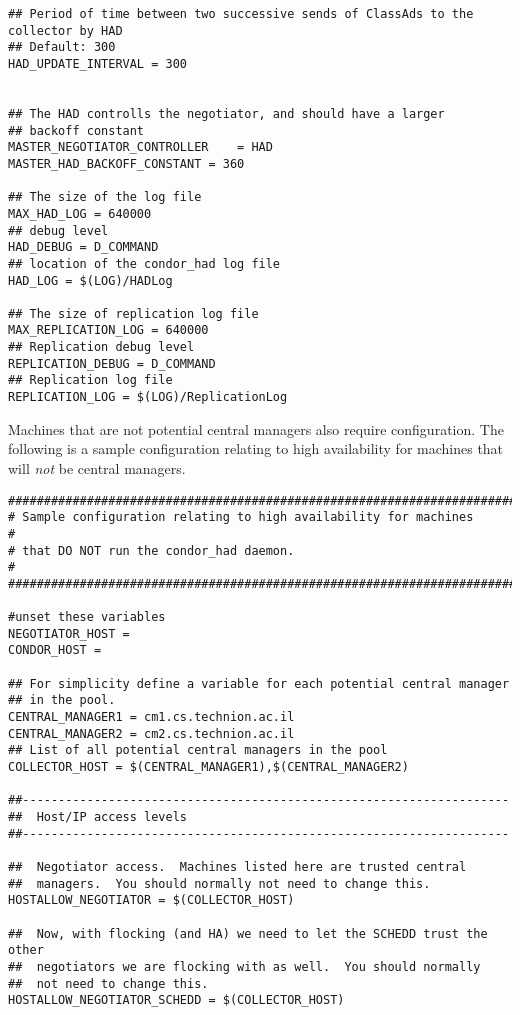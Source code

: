 \begin{verbatim}
## Period of time between two successive sends of ClassAds to the collector by HAD
## Default: 300
HAD_UPDATE_INTERVAL = 300


## The HAD controlls the negotiator, and should have a larger
## backoff constant
MASTER_NEGOTIATOR_CONTROLLER	= HAD
MASTER_HAD_BACKOFF_CONSTANT	= 360

## The size of the log file
MAX_HAD_LOG = 640000
## debug level 
HAD_DEBUG = D_COMMAND
## location of the condor_had log file
HAD_LOG = $(LOG)/HADLog

## The size of replication log file
MAX_REPLICATION_LOG = 640000
## Replication debug level 
REPLICATION_DEBUG = D_COMMAND
## Replication log file
REPLICATION_LOG = $(LOG)/ReplicationLog

\end{verbatim}
\normalsize

Machines that are not potential central managers also 
require configuration.
The following is a sample configuration relating to
high availability for machines that will \emph{not} be central managers.

\footnotesize
\begin{verbatim}
##########################################################################
# Sample configuration relating to high availability for machines        # 
# that DO NOT run the condor_had daemon.                                 #
##########################################################################

#unset these variables 
NEGOTIATOR_HOST =
CONDOR_HOST =

## For simplicity define a variable for each potential central manager
## in the pool. 
CENTRAL_MANAGER1 = cm1.cs.technion.ac.il
CENTRAL_MANAGER2 = cm2.cs.technion.ac.il
## List of all potential central managers in the pool
COLLECTOR_HOST = $(CENTRAL_MANAGER1),$(CENTRAL_MANAGER2)

##--------------------------------------------------------------------
##  Host/IP access levels
##--------------------------------------------------------------------

##  Negotiator access.  Machines listed here are trusted central
##  managers.  You should normally not need to change this.
HOSTALLOW_NEGOTIATOR = $(COLLECTOR_HOST)

##  Now, with flocking (and HA) we need to let the SCHEDD trust the other 
##  negotiators we are flocking with as well.  You should normally 
##  not need to change this.
HOSTALLOW_NEGOTIATOR_SCHEDD = $(COLLECTOR_HOST) 
\end{verbatim}
\normalsize


